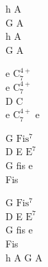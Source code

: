 \begin{chord}
    h A\\
    G A\\
    h A\\
    G A

    e $\mathrm{C_7^{4+}}$\\
    e $\mathrm{C_7^{4+}}$\\
    D C\\
    e $\mathrm{C_7^{4+}}$ e

    G $\mathrm{Fis^7}$\\
    D E $\mathrm{E^7}$\\
    G fis e\\
    Fis

    G $\mathrm{Fis^7}$\\
    D E $\mathrm{E^7}$\\
    G fis e\\
    Fis\\
    h A G A
\end{chord}
